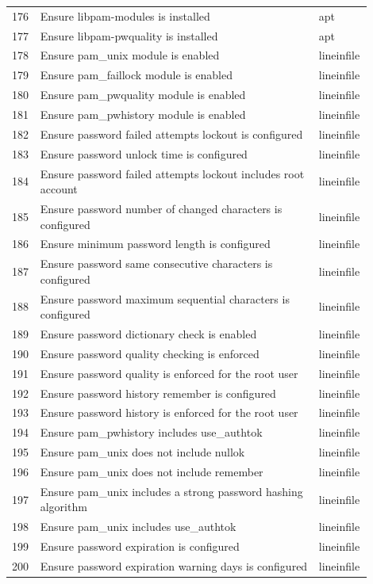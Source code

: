 \begin{longtable}{|p{0.05\linewidth}|p{0.75\linewidth}|p{0.1\linewidth}|}
176 & Ensure libpam-modules is installed & apt \\
177 & Ensure libpam-pwquality is installed & apt \\
178 & Ensure pam\_unix module is enabled & lineinfile \\
179 & Ensure pam\_faillock module is enabled & lineinfile \\
180 & Ensure pam\_pwquality module is enabled & lineinfile \\
181 & Ensure pam\_pwhistory module is enabled & lineinfile \\
182 & Ensure password failed attempts lockout is configured & lineinfile \\
183 & Ensure password unlock time is configured & lineinfile \\
184 & Ensure password failed attempts lockout includes root account & lineinfile \\
185 & Ensure password number of changed characters is configured & lineinfile \\
186 & Ensure minimum password length is configured & lineinfile \\
187 & Ensure password same consecutive characters is configured & lineinfile \\
188 & Ensure password maximum sequential characters is configured & lineinfile \\
189 & Ensure password dictionary check is enabled & lineinfile \\
190 & Ensure password quality checking is enforced & lineinfile \\
191 & Ensure password quality is enforced for the root user & lineinfile \\
192 & Ensure password history remember is configured & lineinfile \\
193 & Ensure password history is enforced for the root user & lineinfile \\
194 & Ensure pam\_pwhistory includes use\_authtok & lineinfile \\
195 & Ensure pam\_unix does not include nullok & lineinfile \\
196 & Ensure pam\_unix does not include remember & lineinfile \\
197 & Ensure pam\_unix includes a strong password hashing algorithm & lineinfile \\
198 & Ensure pam\_unix includes use\_authtok & lineinfile \\
199 & Ensure password expiration is configured & lineinfile \\
200 & Ensure password expiration warning days is configured & lineinfile \\

\end{longtable}
